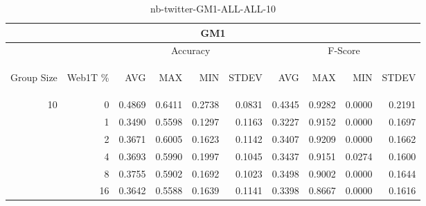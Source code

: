\begin{center}
\begin{table}[htbp]
\begin{tabular}{ | r | r | r | r | r | r | r | r | r | r |}
\hline
\multicolumn{10}{|c|}{GM1}\\
\hline
 & & \multicolumn{4}{|c|}{Accuracy} & \multicolumn{4}{|c|}{F-Score}\\ \cline{3-10}
\begin{sideways}Group Size\end{sideways} & \begin{sideways}Web1T \%\end{sideways} & \begin{sideways}AVG\end{sideways} & \begin{sideways}MAX\end{sideways} & \begin{sideways}MIN\end{sideways} & \begin{sideways}STDEV\end{sideways} & \begin{sideways}AVG\end{sideways} & \begin{sideways}MAX\end{sideways} & \begin{sideways}MIN\end{sideways} & \begin{sideways}STDEV\end{sideways}\\
\hline
\multirow{5}{*}{10}
 & 0 & 0.4869 & 0.6411 & 0.2738 & 0.0831 & 0.4345 & 0.9282 & 0.0000 & 0.2191\\ \cline{2-10}
 & 1 & 0.3490 & 0.5598 & 0.1297 & 0.1163 & 0.3227 & 0.9152 & 0.0000 & 0.1697\\ \cline{2-10}
 & 2 & 0.3671 & 0.6005 & 0.1623 & 0.1142 & 0.3407 & 0.9209 & 0.0000 & 0.1662\\ \cline{2-10}
 & 4 & 0.3693 & 0.5990 & 0.1997 & 0.1045 & 0.3437 & 0.9151 & 0.0274 & 0.1600\\ \cline{2-10}
 & 8 & 0.3755 & 0.5902 & 0.1692 & 0.1023 & 0.3498 & 0.9002 & 0.0000 & 0.1644\\ \cline{2-10}
 & 16 & 0.3642 & 0.5588 & 0.1639 & 0.1141 & 0.3398 & 0.8667 & 0.0000 & 0.1616\\ \cline{2-10}
\hline
\end{tabular}
\caption{nb-twitter-GM1-ALL-ALL-10}
\label{table:nb-twitter-GM1-ALL-ALL-10}
\end{table}
\end{center}

